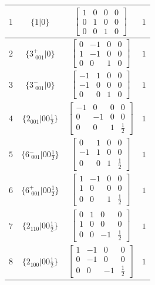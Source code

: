 \documentclass[fleqn,8pt]{jsarticle}
\begin{document}
\begin{longtable}{cccc}
$ 1 $ & $ \{1|0\} $ & $ \begin{bmatrix} 1 & 0 & 0 & 0 \\ 0 & 1 & 0 & 0 \\ 0 & 0 & 1 & 0 \end{bmatrix} $ & $ 1 $ \\ \hline
$ 2 $ & $ \{3^{+}_{\,\,001}|0\} $ & $ \begin{bmatrix} 0 & -1 & 0 & 0 \\ 1 & -1 & 0 & 0 \\ 0 & 0 & 1 & 0 \end{bmatrix} $ & $ 1 $ \\ \hline
$ 3 $ & $ \{3^{-}_{\,\,001}|0\} $ & $ \begin{bmatrix} -1 & 1 & 0 & 0 \\ -1 & 0 & 0 & 0 \\ 0 & 0 & 1 & 0 \end{bmatrix} $ & $ 1 $ \\ \hline
$ 4 $ & $ \{2{}_{001}|0 0 \frac{1}{2}\} $ & $ \begin{bmatrix} -1 & 0 & 0 & 0 \\ 0 & -1 & 0 & 0 \\ 0 & 0 & 1 & \frac{1}{2} \end{bmatrix} $ & $ 1 $ \\ \hline
$ 5 $ & $ \{6^{-}_{\,\,001}|0 0 \frac{1}{2}\} $ & $ \begin{bmatrix} 0 & 1 & 0 & 0 \\ -1 & 1 & 0 & 0 \\ 0 & 0 & 1 & \frac{1}{2} \end{bmatrix} $ & $ 1 $ \\ \hline
$ 6 $ & $ \{6^{+}_{\,\,001}|0 0 \frac{1}{2}\} $ & $ \begin{bmatrix} 1 & -1 & 0 & 0 \\ 1 & 0 & 0 & 0 \\ 0 & 0 & 1 & \frac{1}{2} \end{bmatrix} $ & $ 1 $ \\ \hline
$ 7 $ & $ \{2{}_{110}|0 0 \frac{1}{2}\} $ & $ \begin{bmatrix} 0 & 1 & 0 & 0 \\ 1 & 0 & 0 & 0 \\ 0 & 0 & -1 & \frac{1}{2} \end{bmatrix} $ & $ 1 $ \\ \hline
$ 8 $ & $ \{2{}_{100}|0 0 \frac{1}{2}\} $ & $ \begin{bmatrix} 1 & -1 & 0 & 0 \\ 0 & -1 & 0 & 0 \\ 0 & 0 & -1 & \frac{1}{2} \end{bmatrix} $ & $ 1 $ \\ \hline

\end{longtable}
\end{document}
